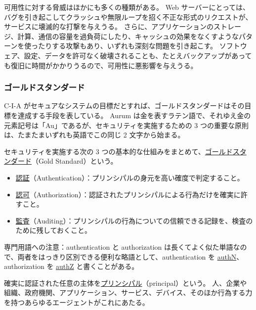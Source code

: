 \documentclass[uplatex]{jsarticle}
\def\label#1{}%
\begin{document}
可用性に対する脅威はほかにも多くの種類がある。
Web サーバーにとっては、バグを引き起こしてクラッシュや無限ループを招く不正な形式のリクエストが、サービスに壊滅的な打撃を与えうる。
さらに、アプリケーションのストレージ、計算、通信の容量を過負荷にしたり、キャッシュの効果をなくすようなパターンを使ったりする攻撃もあり、いずれも深刻な問題を引き起こす。
ソフトウェア、設定、データを許可なく破壊されることも、たとえバックアップがあっても復旧に時間がかかりうるので、可用性に悪影響を与えうる。

\subsubsection{ゴールドスタンダード}

C-I-A がセキュアなシステムの目標だとすれば、ゴールドスタンダードはその目標を達成する手段を表している。
Aurum は金を表すラテン語で、それゆえ金の元素記号は「Au」であるが、セキュリティを実施するための 3 つの重要な原則は、たまたまいずれも英語でこの同じ 2 文字から始まる。

\begin{dfn}[ゴールドスタンダード]\label{dfn:ch1-gold-standard}
セキュリティを実施する次の 3 つの基本的な仕組みをまとめて、\underline{ゴールドスタンダード}（Gold Standard）という。
\begin{itemize}
\item \underline{認証}（Authentication）：プリンシパルの身元を高い確度で判定すること。
\item \underline{認可}（Authorization）：認証されたプリンシパルによる行為だけを確実に許すこと。
\item \underline{監査}（Auditing）：プリンシパルの行為についての信頼できる記録を、検査のために残しておくこと。
\end{itemize}
\end{dfn}

\begin{rem}\label{rem:ch1-authn-authz}
専門用語への注意：authentication と authorization は長くてよく似た単語なので、両者をはっきり区別できる便利な略語として、authentication を \underline{authN}、authorization を \underline{authZ} と書くことがある。
\end{rem}

\begin{dfn}[プリンシパル]\label{dfn:ch1-principal}
確実に認証された任意の主体を\underline{プリンシパル}（principal）という。
人、企業や組織、政府機関、アプリケーション、サービス、デバイス、そのほか行為する力を持つあらゆるエージェントがこれにあたる。
\end{dfn}
\end{document}
